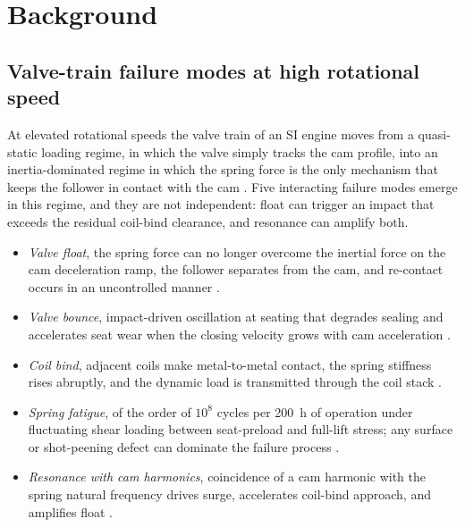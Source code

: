 
\section{Background}\label{sec:background}

\subsection{Valve-train failure modes at high rotational speed}
\label{sec:bg-failure-modes}

At elevated rotational speeds the valve train of an SI engine moves
from a quasi-static loading regime, in which the valve simply tracks
the cam profile, into an inertia-dominated regime in which the spring
force is the only mechanism that keeps the follower in contact with
the cam \citep{heywood1988,taylor1985}. Five interacting failure
modes emerge in this regime, and they are not independent: float can
trigger an impact that exceeds the residual coil-bind clearance,
and resonance can amplify both.

\begin{itemize}\setlength{\itemsep}{0.2em}
\item \emph{Valve float}, the spring force can no longer overcome
the inertial force on the cam deceleration ramp, the follower
separates from the cam, and re-contact occurs in an uncontrolled
manner \citep{heywood1988,taylor1985}.
\item \emph{Valve bounce}, impact-driven oscillation at seating
that degrades sealing and accelerates seat wear when the closing
velocity grows with cam acceleration \citep{heywood1988}.
\item \emph{Coil bind}, adjacent coils make metal-to-metal contact,
the spring stiffness rises abruptly, and the dynamic load is
transmitted through the coil stack \citep{shigley2020}.
\item \emph{Spring fatigue}, of the order of $10^{8}$ cycles per
200~h of operation under fluctuating shear loading between
seat-preload and full-lift stress; any surface or shot-peening
defect can dominate the failure process \citep{shigley2020}.
\item \emph{Resonance with cam harmonics}, coincidence of a cam
harmonic with the spring natural frequency drives surge, accelerates
coil-bind approach, and amplifies float \citep{heywood1988}.
\end{itemize}

